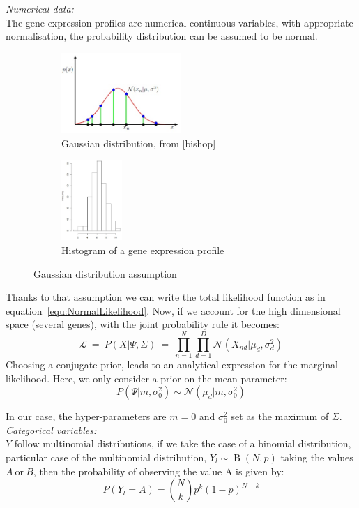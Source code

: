\documentclass[twocolumn]{article}
\begin{document}
\emph{Numerical data:}\\
The gene expression profiles are numerical continuous variables, with appropriate normalisation, the probability distribution can be assumed to be normal.
\begin{figure}[!]
    \centering
    \begin{subfigure}[t]{0.25\textwidth}
        \centering
        \includegraphics[height=1.2in]{img/gaussDist.jpg}
        \caption{Gaussian distribution, from [bishop]}
    \end{subfigure}%
    \begin{subfigure}[t]{0.25\textwidth}
        \centering
        \includegraphics[height=1.2in]{img/distVar.jpg}
        \caption{Histogram of a gene expression profile}
    \end{subfigure}
    \caption{Gaussian distribution assumption}
\end{figure}
Thanks to that assumption we can write the total likelihood function as in equation~\ref{equ:NormalLikelihood}.
Now, if we account for the high dimensional space (several genes), with the joint probability rule it becomes:
\begin{equation}
    \mathcal{L}\ =\ P(X|\Psi,\Sigma)\ =\ \prod_{n=1}^{N}\prod_{d=1}^{D}\mathcal{N}(X_{nd}|\mu_d,\sigma_d^2)
\end{equation}
Choosing a conjugate prior, leads to  an analytical expression for the marginal likelihood.
Here, we only consider a prior on the mean parameter:\\
$$P(\Psi|m,\sigma_0^2)\sim\mathcal{N}(\mu_d|m,\sigma_0^2)$$


In our case, the hyper-parameters are $m=0$ and $\sigma_0^2$ set as the maximum of $\Sigma$.\\

\emph{Categorical variables:}\\
$Y$ follow multinomial distributions, if we take the case of a binomial distribution, particular case of the multinomial distribution, $Y_l\sim\operatorname{B} \left({N, p}\right)$ taking the values $A\ \text{or}\ B$, then the probability of observing the value A is given by:\\
$$P(Y_l=A) = {N\choose k}p^k(1-p)^{N-k}$$
\end{document}
